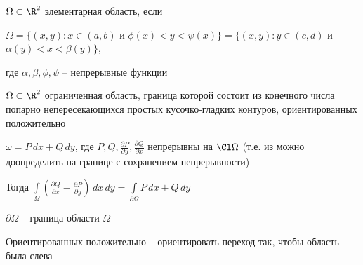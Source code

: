 
\begin{definition}\thmslashn
	
	$\Omega \subset \R^2$ элементарная область, если 
	
	$\Omega = \{ (x, y): x \in (a, b) $ и $ \phi(x) < y < \psi(x) \} = \{ (x, y): y \in (c, d) $ и $ \alpha(y) < x < \beta(y) \}$, 
	
	где $\alpha, \beta, \phi, \psi$ -- непрерывные функции
	
\end{definition}

\begin{theorem}\thmslashn
	
	$\Omega \subset \R^2$ ограниченная область, граница которой состоит из конечного числа попарно непересекающихся простых кусочко-гладких контуров, ориентированных положительно
	
	$\omega = P\,dx + Q\,dy$, где $P, Q, \frac{\partial P}{\partial y}, \frac{\partial Q}{\partial x}$ непрерывны на $\Cl \Omega$ (т.е. из можно доопределить на границе с сохранением непрерывности)
	
	Тогда $\int\limits_\Omega \left( \frac{\partial Q}{\partial x}-\frac{\partial P}{\partial y} \right) \,dx\,dy = \int\limits_{\partial \Omega} P\,dx + Q\,dy$
	
\end{theorem}

\begin{remark_author}\thmslashn

	$\partial \Omega$ -- граница области $\Omega$
	
	Ориентированных положительно -- ориентировать переход так, чтобы область была слева

\end{remark_author}

